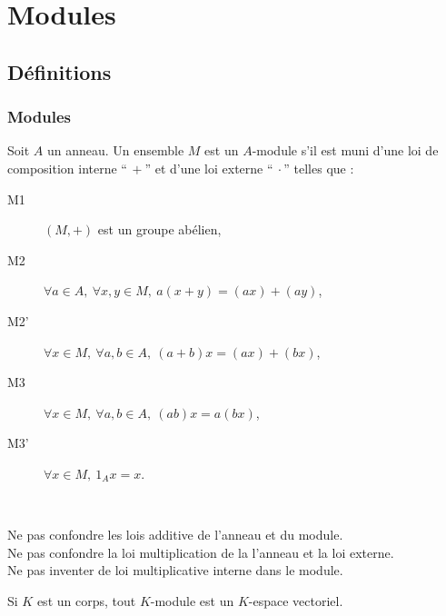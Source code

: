 \section{Modules}
\vspace{0.5em}
\hfill {} \hfill
\vspace{0.5em}

\subsection{Définitions}
\vspace{0.5em}

\subsubsection{Modules}
\vspace{0.5em}

\begin{defi}[Module]
 
 Soit $A$ un anneau. Un ensemble $M$ est un $A$-module s'il est muni d'une loi
de composition interne ``$\,+$'' et d'une loi externe ``$\:\cdotp$'' telles que
:
\begin{description}
 \item [M1\:] $(M,+)$ est un groupe abélien,
 \item [M2\:] $\forall a\in A,\ \forall x,y \in M,\ a(x+y) = (ax)+(ay)$, 
 \item [M2']  $\forall x\in M,\ \forall a,b\in A,\ (a+b)x = (ax)+(bx)$,
 \item [M3\:] $\forall x\in M,\ \forall a,b\in A,\ (ab)x = a(bx)$,
 \item [M3']   $\forall x \in M,\ 1_A x= x$.
\end{description}
\end{defi}

\begin{example}[Attention]\

 Ne pas confondre les lois additive de l'anneau et du module.\\ Ne pas confondre
la loi multiplication de la l'anneau et la loi externe.\\ Ne pas inventer de loi
multiplicative interne dans le module.
\end{example}

\begin{example}[Remarque]
 Si $K$ est un corps, tout $K$-module est un $K$-espace vectoriel.
\end{example}

